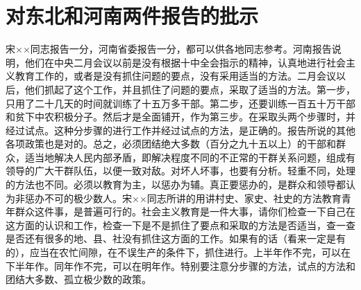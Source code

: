 \section[对东北和河南两件报告的批示（一九六三年五月八日）]{对东北和河南两件报告的批示}


宋××同志报告一分，河南省委报告一分，都可以供各地同志参考。河南报告说明，他们在中央二月会议以前是没有根据十中全会指示的精神，认真地进行社会主义教育工作的，或者是没有抓住问题的要点，没有采用适当的方法。二月会议以后，他们抓起了这个工作，并且抓住了问题的要点，采取了适当的方法。第一步，只用了二十几天的时间就训练了十五万多干部。第二步，还要训练一百五十万干部和贫下中农积极分子。然后才是全面铺开，作为第三步。在采取头两个步骤时，并经过试点。这种分步骤的进行工作并经过试点的方法，是正确的。报告所说的其他各项政策也是对的。总之，必须团结绝大多数（百分之九十五以上）的干部和群众，适当地解决人民内部矛盾，即解决程度不同的不正常的干群关系问题，组成有领导的广大干群队伍，以便一致对敌。对坏人坏事，也要有分析。轻重不同，处理的方法也不同。必须以教育为主，以惩办为辅。真正要惩办的，是群众和领导都认为非惩办不可的极少数人。宋××同志所讲的用讲村史、家史、社史的方法教育青年群众这件事，是普遍可行的。社会主义教育是一件大事，请你们检查一下自己在这方面的认识和工作，检查一下是不是抓住了要点和采取的方法是否适当，查一查是否还有很多的地、县、社没有抓住这方面的工作。如果有的话（看来一定是有的），应当在农忙间隙，在不误生产的条件下，抓住进行。上半年作不完，可以在下半年作。同年作不完，可以在明年作。特别要注意分步骤的方法，试点的方法和团结大多数、孤立极少数的政策。


